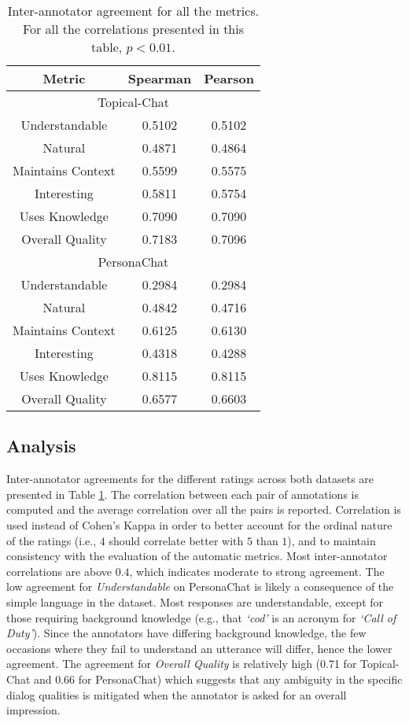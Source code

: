 \documentclass[11pt,a4paper]{article}
\begin{document}
\begin{table}
    \centering
    \begin{tabular}{|c|c|c|}
    \hline
    \textbf{Metric}  & \textbf{Spearman} & \textbf{Pearson} \\ \hline
    \multicolumn{3}{|c|}{Topical-Chat} \\ \hline
    Understandable & 0.5102 & 0.5102 \\
    Natural & 0.4871 & 0.4864 \\
    Maintains Context & 0.5599 & 0.5575 \\    
    Interesting & 0.5811 & 0.5754 \\   
    Uses Knowledge & 0.7090 & 0.7090 \\    
    Overall Quality & 0.7183 & 0.7096 \\    \hline
    \multicolumn{3}{|c|}{PersonaChat} \\ \hline
    Understandable & 0.2984 & 0.2984 \\
    Natural & 0.4842 & 0.4716 \\
    Maintains Context & 0.6125 & 0.6130 \\    
    Interesting & 0.4318 & 0.4288 \\   
    Uses Knowledge & 0.8115 & 0.8115 \\    
    Overall Quality & 0.6577 & 0.6603 \\    \hline
    \end{tabular}
    \caption{Inter-annotator agreement for all the metrics. For all the correlations presented in this table, $p <0.01$.}
    \label{tab:agreement}
\end{table}

\subsection{Analysis}

Inter-annotator agreements for the different ratings across both datasets are presented in Table \ref{tab:agreement}. The correlation between each pair of annotations is computed and the average correlation over all the pairs is reported. Correlation is used instead of Cohen's Kappa in order to better account for the ordinal nature of the ratings (i.e., $4$ should correlate better with $5$ than $1$), and to maintain consistency with the evaluation of the automatic metrics. Most inter-annotator correlations are above $0.4$, which indicates moderate to strong agreement. The low agreement for \textit{Understandable} on PersonaChat is likely a consequence of the simple language in the dataset. Most responses are understandable, except for those requiring background knowledge (e.g., that \textit{`cod'} is an acronym for \textit{`Call of Duty'}). Since the annotators have differing background knowledge, the few occasions where they fail to understand an utterance will differ, hence the lower agreement. The agreement for \textit{Overall Quality} is relatively high (0.71 for Topical-Chat and 0.66 for PersonaChat) which suggests that any ambiguity in the specific dialog qualities is mitigated when the annotator is asked for an overall impression.
\end{document}
